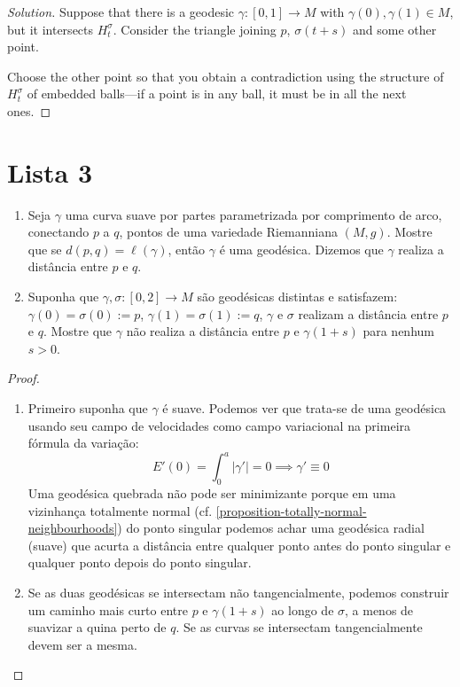 \begin{proof}[Solution]
Suppose that there is a geodesic $\gamma:[0,1]\to M$ with $\gamma(0),\gamma(1)
\in M$, but it intersects $H_t^{\sigma}$. Consider the triangle joining $p$,
$\sigma(t+s)$ and some other point.

Choose the other point so that you obtain a contradiction using the structure of
$H_t^{\sigma}$ of embedded balls---if a point is in any ball, it must be in all
the next ones.
\end{proof}

\section{Lista 3}
\label{section-lista-3}

\begin{exercise}
\label{exercise-curvas-minimizantes}
\begin{enumerate}
\item Seja $\gamma$ uma curva suave por partes parametrizada por comprimento de
 arco, conectando $p$ a $q$, pontos de uma variedade Riemanniana $(M,g)$.
 Mostre que se $d(p,q)=\ell(\gamma)$, então $\gamma$ é uma geodésica.
 Dizemos que $\gamma$ realiza a distância entre $p$ e $q$.
\item Suponha que $\gamma,\sigma:[0,2]\to M$ são geodésicas distintas
 e satisfazem: $\gamma(0)=\sigma(0):=p$, $\gamma(1)=\sigma(1):=q$, 
$\gamma$ e $\sigma$ realizam a distância entre $p$ e $q$.
 Mostre que $\gamma$ não realiza a distância entre $p$ e $\gamma(1+s)$ 
para nenhum $s>0$.
\end{enumerate}
\end{exercise}

\begin{proof}
\begin{enumerate}
\item Primeiro suponha que $\gamma$ é suave. Podemos ver que trata-se de uma 
geodésica usando seu campo de velocidades como campo variacional na primeira
fórmula da variação:
$$
E'(0)=\int_0^a |\gamma'|=0 \implies \gamma'\equiv 0
$$
Uma geodésica quebrada não pode ser minimizante porque em uma vizinhança 
totalmente normal (cf. \ref{proposition-totally-normal-neighbourhoods}) 
do ponto singular podemos achar uma geodésica radial (suave)
 que acurta a distância entre qualquer ponto antes do ponto singular
 e qualquer ponto depois do ponto singular.
\item Se as duas geodésicas se intersectam não tangencialmente, podemos 
construir um caminho mais curto entre $p$ e $\gamma(1+s)$ ao longo de $\sigma$,
a menos de suavizar a quina perto de $q$. Se as curvas se intersectam
 tangencialmente devem ser a mesma.
\end{enumerate}
\end{proof}

